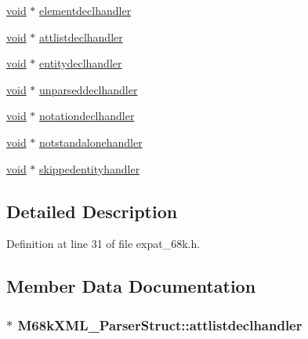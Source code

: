 \begin{DoxyCompactItemize}
\hyperlink{sound_8c_ae35f5844602719cf66324f4de2a658b3}{void} $\ast$ \hyperlink{struct_m68k_x_m_l___parser_struct_a36a9bd68380965e99dc263ce69f2d4f3}{elementdeclhandler}
\item 
\hyperlink{sound_8c_ae35f5844602719cf66324f4de2a658b3}{void} $\ast$ \hyperlink{struct_m68k_x_m_l___parser_struct_a45f052d93c785d696b94043692bead9a}{attlistdeclhandler}
\item 
\hyperlink{sound_8c_ae35f5844602719cf66324f4de2a658b3}{void} $\ast$ \hyperlink{struct_m68k_x_m_l___parser_struct_a286c6fe9bc4206210e8cd9344f63dade}{entitydeclhandler}
\item 
\hyperlink{sound_8c_ae35f5844602719cf66324f4de2a658b3}{void} $\ast$ \hyperlink{struct_m68k_x_m_l___parser_struct_aeb07cf8c037430434f378c82df2b4417}{unparseddeclhandler}
\item 
\hyperlink{sound_8c_ae35f5844602719cf66324f4de2a658b3}{void} $\ast$ \hyperlink{struct_m68k_x_m_l___parser_struct_ada359e87de51a16877f2bb604b27e36f}{notationdeclhandler}
\item 
\hyperlink{sound_8c_ae35f5844602719cf66324f4de2a658b3}{void} $\ast$ \hyperlink{struct_m68k_x_m_l___parser_struct_adace0166af3051b8ebd883d95d31dc26}{notstandalonehandler}
\item 
\hyperlink{sound_8c_ae35f5844602719cf66324f4de2a658b3}{void} $\ast$ \hyperlink{struct_m68k_x_m_l___parser_struct_a56f4f7320110aea4840ca5eda61d0233}{skippedentityhandler}
\end{DoxyCompactItemize}


\subsection{Detailed Description}


Definition at line 31 of file expat\+\_\+68k.\+h.



\subsection{Member Data Documentation}
\subsubsection[{\texorpdfstring{attlistdeclhandler}{attlistdeclhandler}}]{$\ast$ M68k\+X\+M\+L\+\_\+\+Parser\+Struct\+::attlistdeclhandler}\hypertarget{struct_m68k_x_m_l___parser_struct_a45f052d93c785d696b94043692bead9a}{}\label{struct_m68k_x_m_l___parser_struct_a45f052d93c785d696b94043692bead9a}


